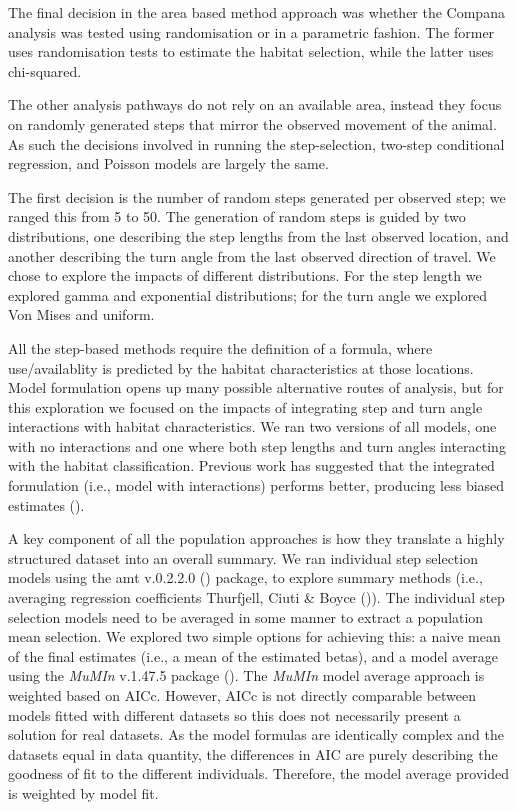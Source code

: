 \documentclass[10pt,a4paper]{article}
\begin{document}
The final decision in the area based method approach was whether the Compana analysis was tested using randomisation or in a parametric fashion.
The former uses randomisation tests to estimate the habitat selection, while the latter uses chi-squared.

The other analysis pathways do not rely on an available area, instead they focus on randomly generated steps that mirror the observed movement of the animal.
As such the decisions involved in running the step-selection, two-step conditional regression, and Poisson models are largely the same.

The first decision is the number of random steps generated per observed step; we ranged this from 5 to 50.
The generation of random steps is guided by two distributions, one describing the step lengths from the last observed location, and another describing the turn angle from the last observed direction of travel.
We chose to explore the impacts of different distributions.
For the step length we explored gamma and exponential distributions; for the turn angle we explored Von Mises and uniform.

All the step-based methods require the definition of a formula, where use/availablity is predicted by the habitat characteristics at those locations.
Model formulation opens up many possible alternative routes of analysis, but for this exploration we focused on the impacts of integrating step and turn angle interactions with habitat characteristics.
We ran two versions of all models, one with no interactions and one where both step lengths and turn angles interacting with the habitat classification.
Previous work has suggested that the integrated formulation (i.e., model with interactions) performs better, producing less biased estimates ().

A key component of all the population approaches is how they translate a highly structured dataset into an overall summary.
We ran individual step selection models using the amt v.0.2.2.0 () package, to explore summary methods (i.e., averaging regression coefficients Thurfjell, Ciuti \& Boyce ()).
The individual step selection models need to be averaged in some manner to extract a population mean selection.
We explored two simple options for achieving this: a naive mean of the final estimates (i.e., a mean of the estimated betas), and a model average using the \emph{MuMIn} v.1.47.5 package ().
The \emph{MuMIn} model average approach is weighted based on AICc.
However, AICc is not directly comparable between models fitted with different datasets so this does not necessarily present a solution for real datasets.
As the model formulas are identically complex and the datasets equal in data quantity, the differences in AIC are purely describing the goodness of fit to the different individuals.
Therefore, the model average provided is weighted by model fit.
\end{document}
